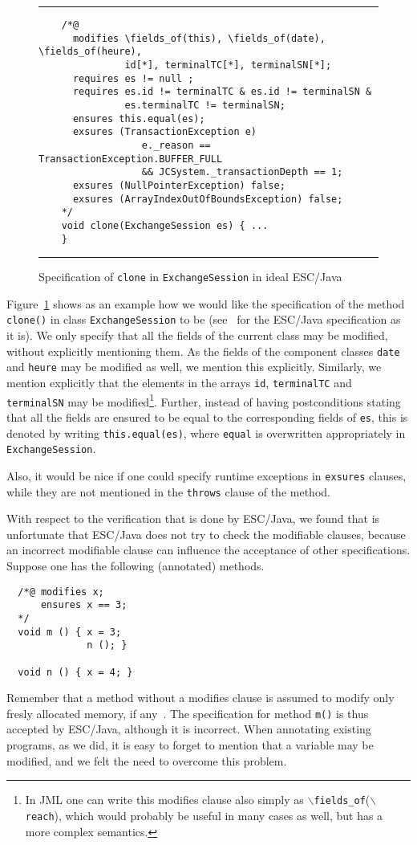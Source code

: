 \documentclass[a4paper]{llncs}
\newcommand{\fieldsof}{\(\backslash\)\texttt{fields\_of}}
\newcommand{\reach}{\(\backslash\)\texttt{reach}}
\begin{document}
\begin{figure}[tbh]
\rule{\linewidth}{0.3mm}
\begin{verbatim}
    /*@
      modifies \fields_of(this), \fields_of(date), \fields_of(heure),
               id[*], terminalTC[*], terminalSN[*];
      requires es != null ;
      requires es.id != terminalTC & es.id != terminalSN &
               es.terminalTC != terminalSN;
      ensures this.equal(es);
      exsures (TransactionException e) 
                  e._reason == TransactionException.BUFFER_FULL 
                  && JCSystem._transactionDepth == 1; 
      exsures (NullPointerException) false;
      exsures (ArrayIndexOutOfBoundsException) false;
    */
    void clone(ExchangeSession es) { ...
    } 
\end{verbatim}
\caption{Specification of \texttt{clone} in \texttt{ExchangeSession}
in ideal ESC/Java}
\label{FigIdealESC}
\rule{\linewidth}{0.3mm}
\end{figure}

Figure~\ref{FigIdealESC} shows as an example how we would like the
specification of the method \texttt{clone()} in class
\texttt{ExchangeSession} to be (see~\cite{CatanoH01Url} for the
ESC/Java specification as it is). We only specify that all the fields
of the current class may be modified, without explicitly mentioning
them. As the fields of the component classes \texttt{date} and
\texttt{heure} may be modified as well, we mention this
explicitly. Similarly, we mention explicitly that the elements in the
arrays \texttt{id}, \texttt{terminalTC} and \texttt{terminalSN} may be
modified\footnote{In JML one can write this modifies clause also
simply as \fieldsof(\reach), which would probably be useful in many
cases as well, but has a more complex semantics.}. Further, instead of
having postconditions stating that all the fields are ensured to be
equal to the corresponding fields of \texttt{es}, this is denoted by
writing \texttt{this.equal(es)}, where \texttt{equal} is overwritten
appropriately in \texttt{ExchangeSession}.

Also, it would be nice if one could specify runtime exceptions in
\texttt{exsures} clauses, while they are not mentioned in the
\texttt{throws} clause of the method.


With respect to the verification that is done by ESC/Java, we found
that is unfortunate that ESC/Java does not try to check the modifiable 
clauses, because an incorrect modifiable clause can influence the 
acceptance of other specifications. Suppose one has the following
(annotated) methods.
\begin{verbatim}
  /*@ modifies x;
      ensures x == 3;
  */
  void m () { x = 3;
              n (); }

  void n () { x = 4; }
\end{verbatim}
Remember that a method without a modifies clause is assumed to modify
only fresly allocated memory, if any~\cite{LeinoNS00}. The
specification for method \texttt{m()} is thus accepted by ESC/Java,
although it is incorrect. When annotating existing programs, as we
did, it is easy to forget to mention that a variable may be modified,
and we felt the need to overcome this problem.
\end{document}
